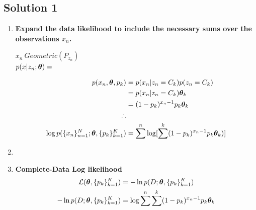 \documentclass[submit]{harvardml}
\begin{document}
\subsection*{Solution 1}

\begin{enumerate}
    \item \textbf{Expand the data likelihood to include the necessary sums over the observations $x_n$.}
    
    $x_n ~ Geometric(P_{z_n})$\\
    $p(x| z_n; \boldsymbol{\theta}) = $
    
    
    \begin{align*}
        p(x_n, \boldsymbol{\theta}, p_k) &= p(x_n | z_n = C_k) p(z_n = C_k) \\
        &= p(x_n | z_n = C_k) \boldsymbol{\theta}_k \\
        &= (1 - p_k)^{x_n - 1} p_k \boldsymbol{\theta}_k \\
        \therefore \\
        \log p(\{x_n\}^N_{n=1}; \boldsymbol{\theta}, \{p_k\}^K_{k = 1}) &=  \sum^n  \log [ \sum^k (1 - p_k)^{x_n - 1} p_k \boldsymbol{\theta}_k)]
    \end{align*}
    
    \item 
    \item \textbf{Complete-Data Log likelihood}
    \begin{align*}
        \mathcal{L}(\boldsymbol{\theta}, \{p_k\}^K_{k=1}) &=  -\ln p(D; \boldsymbol{\theta}, \{p_k\}^K_{k=1}) \\
        -\ln p(D; \boldsymbol{\theta}, \{p_k\}^K_{k=1}) &= \log \sum^n \sum^k (1 - p_k)^{x_n - 1} p_k \boldsymbol{\theta}_k
    \end{align*}
\end{enumerate}
\end{document}

